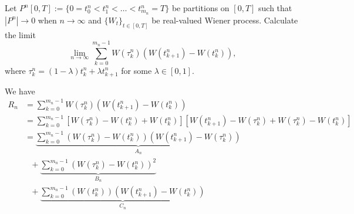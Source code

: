 \begin{example}
  \label{example:wdw}
  Let $P^n[0,T]:=\{0=t^n_0<t^n_1<\ldots<t^n_{m_n}=T\}$ be partitions on $[0,T]$ such that $|P^n|\to0$ when $n\to\infty$ and $\{W_t\}_{t\in[0,T]}$ be real-valued Wiener process. Calculate the limit
  \begin{equation}
    \lim\limits_{n\to\infty}\sum\limits_{k=0}^{m_n-1} W(\tau_k^n)(W(t^n_{k+1})-W(t^n_{k})),
  \end{equation}
  where
  $\tau_k^n = (1-\lambda) t_k^n + \lambda t_{k+1}^n$ for some $\lambda\in[0,1]$.
\end{example}

\begin{solution}
  We have
  \begin{align*}
    R_n
     & = \sum\limits_{k=0}^{m_n-1} W(\tau_k^n)(W(t^n_{k+1})-W({t^n_{k}}))                                                                      \\
     & =
    \sum\limits_{k=0}^{m_n-1}\left[ W(\tau_k^n) - W(t_k^n) + W(t_k^n)\right]\left[W(t^n_{k+1}) - W(\tau_k^n) + W(\tau_k^n) - W(t^n_{k})\right] \\
     & = \underbrace{\sum\limits_{k=0}^{m_n-1}(W(\tau_k^n) - W(t_k^n))(W(t^n_{k+1}) - W(\tau_k^n)) }_{A_n}
    \\
     & \,\,\,\, + \underbrace{\sum\limits_{k=0}^{m_n-1}(W(\tau_k^n) - W(t_k^n))^2  }_{B_n}
    \\
     & \,\,\,\, + \underbrace{ \sum\limits_{k=0}^{m_n-1}(W(t_k^n))(W(t^n_{k+1}) - W(t_k^n))}_{C_n}
  \end{align*}


\end{solution}
